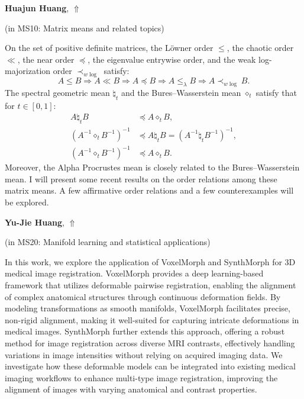 \documentclass[ILAS2025-program.tex]{subfiles}
\begin{document}
\hypertarget{down0133}{}\begin{ilasabstract}
    
\textbf{Huajun Huang},  \hfill \hyperlink{up0133}{$\Uparrow$}
    
    
(in {\color{mstitle}MS10: Matrix means and related topics})
        
\mtskip
    On the set  of positive definite matrices, 
the L\"owner order \(\le\), the chaotic order \(\ll\), the near order \(\preceq\), the eigenvalue entrywise order, and the weak log-majorization order \(\prec_{w \log}\) satisfy:
\[
A \le B \Longrightarrow A \ll B  \Longrightarrow  A \preceq B  \Longrightarrow A \le_{\lambda} B \Longrightarrow A \prec_{w \log} B.
\]
The spectral geometric mean \(\natural_t\) and the Bures–Wasserstein mean \(\diamond_t\) satisfy that for \(t \in [0,1]\):
\begin{align*}
	A \natural_t B &\preceq A \diamond_t B, \\
	(A^{-1} \diamond_t B^{-1})^{-1} &\preceq A \natural_t B = (A^{-1} \natural_t B^{-1})^{-1}, \\
	(A^{-1} \diamond_t B^{-1})^{-1} &\preceq A \diamond_t B.
\end{align*}
Moreover, the Alpha Procrustes mean is closely related to the Bures–Wasserstein mean. 
I will present some recent results on the order relations among these matrix means. A few affirmative order relations and a few counterexamples will be explored.
\end{ilasabstract}
    

\hypertarget{down0151}{}\begin{ilasabstract}
    
\textbf{Yu-Jie Huang},  \hfill \hyperlink{up0151}{$\Uparrow$}
    
    
(in {\color{mstitle}MS20: Manifold learning and statistical applications})
        
\mtskip
    In this work, we explore the application of VoxelMorph and SynthMorph for 3D medical image registration. VoxelMorph provides a deep learning-based framework that utilizes deformable pairwise registration, enabling the alignment of complex anatomical structures through continuous deformation fields. By modeling transformations as smooth manifolds, VoxelMorph facilitates precise, non-rigid alignment, making it well-suited for capturing intricate deformations in medical images. SynthMorph further extends this approach, offering a robust method for image registration across diverse MRI contrasts, effectively handling variations in image intensities without relying on acquired imaging data. We investigate how these deformable models can be integrated into existing medical imaging workflows to enhance multi-type image registration, improving the alignment of images with varying anatomical and contrast properties.
\end{ilasabstract}
    
\end{document}
